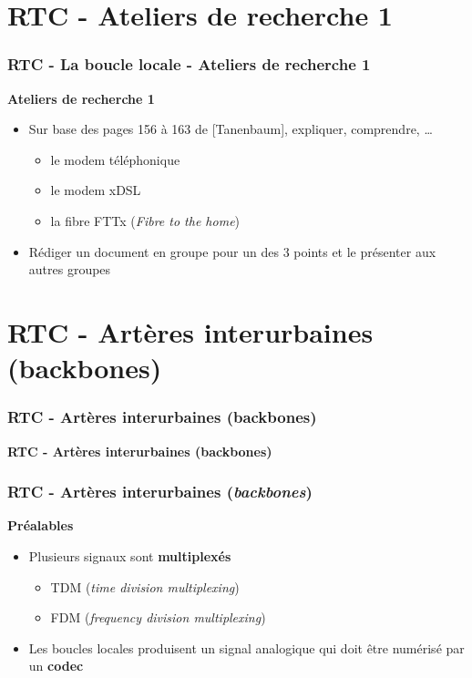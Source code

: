 \section{RTC - Ateliers de recherche 1}

\begin{frame}[fragile]
	\frametitle{RTC - La boucle locale - Ateliers de recherche 1}
{\large\bf Ateliers de recherche 1} 
\begin{itemize}
	\item Sur base des pages 156 à 163 de [Tanenbaum], expliquer, comprendre, … 
	\begin{itemize}
		\item le modem téléphonique
		\item le modem xDSL
		\item la fibre FTTx (\textit{Fibre to the home})
	\end{itemize}
	\item Rédiger un document en groupe pour un des 3 points et le présenter aux autres
	groupes
\end{itemize}
\end{frame}



\section{RTC - Artères interurbaines (backbones)}

\begin{frame}[fragile]
	\frametitle{RTC - Artères interurbaines (backbones)}
\begin{center}
	{\Huge\bf\color{blue} RTC - Artères interurbaines (backbones)}
\end{center}
\end{frame}


\begin{frame}[fragile]
  \frametitle{RTC - Artères interurbaines (\textit{backbones})}
{\large\bf Préalables}
\begin{itemize}
	\item Plusieurs signaux sont \textbf{multiplexés}
	\begin{itemize}
		\item TDM (\textit{time division multiplexing})
		\item FDM (\textit{frequency division multiplexing})
	\end{itemize}
	\item Les boucles locales produisent un signal analogique 
	qui doit être numérisé par un \textbf{codec}
\end{itemize}
\end{frame}

